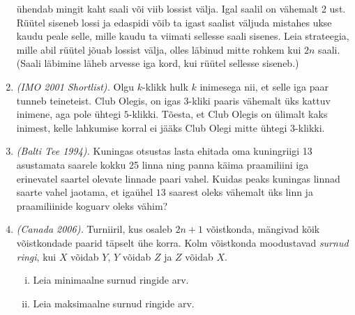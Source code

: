 \documentclass{article}
\begin{document}
\begin{enumerate}
  ühendab mingit kaht saali või viib lossist välja. Igal saalil on
  vähemalt 2 ust. Rüütel siseneb lossi ja edaspidi võib ta igast
  saalist väljuda mistahes ukse kaudu peale selle, mille kaudu ta
  viimati sellesse saali sisenes.  Leia strateegia, mille abil rüütel
  jõuab lossist välja, olles läbinud mitte rohkem kui $2n$
  saali. (Saali läbimine läheb arvesse iga kord, kui rüütel sellesse
  siseneb.)
\item \emph{(IMO 2001 Shortlist).} Olgu $k$-klikk hulk $k$ inimesega
  nii, et selle iga paar tunneb teineteist. Club Olegis, on igas
  $3$-kliki paaris vähemalt üks kattuv inimene, aga pole ühtegi
  $5$-klikki. Tõesta, et Club Olegis on ülimalt kaks inimest, kelle
  lahkumise korral ei jääks Club Olegi mitte ühtegi $3$-klikki.
\item \emph{(Balti Tee 1994).} Kuningas otsustas lasta ehitada oma
  kuningriigi 13 asustamata saarele kokku 25 linna ning panna käima
  praamiliini iga erinevatel saartel olevate linnade paari
  vahel. Kuidas peaks kuningas linnad saarte vahel jaotama, et igaühel
  $13$ saarest oleks vähemalt üks linn ja praamiliinide koguarv oleks
  vähim?
\item \emph{(Canada 2006).} Turniiril, kus osaleb $2n + 1$ võistkonda,
  mängivad kõik võistkondade paarid täpselt ühe korra. Kolm võistkonda
  moodustavad \emph{surnud ringi}, kui $X$ võidab $Y$, $Y$ võidab $Z$
  ja $Z$ võidab $X$.
  \begin{enumerate}[(i)]
  \item Leia minimaalne surnud ringide arv.
  \item Leia maksimaalne surnud ringide arv.
  \end{enumerate}
\end{enumerate}
\end{document}
